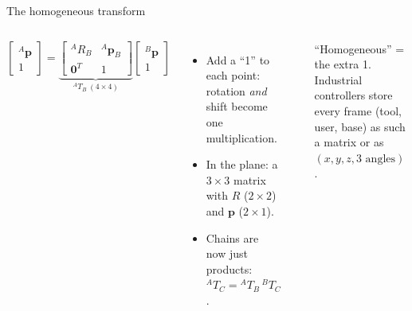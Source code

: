 \documentclass[aspectratio=169,10pt]{beamer}
\begin{document}
\begin{frame}[t]{The homogeneous transform}
\begin{columns}[T,onlytextwidth]
\begin{eqbox}
\vspace{0mm}
\[
\begin{bmatrix}{}^A\bm p\\1\end{bmatrix}
=\underbrace{\begin{bmatrix}{}^A\!R_B & {}^A\bm p_{B}\\ \bm 0^T & 1\end{bmatrix}}_{{}^A T_B\ (4\times4)}
\begin{bmatrix}{}^B\bm p\\1\end{bmatrix}
\]
\vspace{-4mm}
\end{eqbox}
\begin{itemize}\small
\item Add a ``1'' to each point: rotation \emph{and} shift become one multiplication.
\item In the plane: a $3\times3$ matrix with $R$ ($2\times2$) and $\bm p$ ($2\times1$).
\item Chains are now just products: ${}^A T_C={}^A T_B\,{}^B T_C$.
\end{itemize}
\centering
{}\\[2mm]
\begin{notebox}
\small ``Homogeneous'' = the extra 1. Industrial controllers store every frame (tool, user, base) as such a matrix or as $(x,y,z,\text{3 angles})$.
\end{notebox}
\end{columns}
\end{frame}
\end{document}
